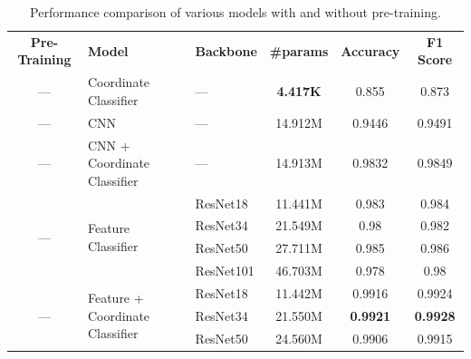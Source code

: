 \documentclass{article}
\begin{document}
\begin{table}[!htp]\centering

  \caption{Performance comparison of various models with and without pre-training.}\label{tab:global_results}
  \scriptsize
  \begin{tabular}{cllccc}\toprule
    \textbf{Pre-Training}             & \textbf{Model}                                   & \textbf{Backbone} & \textbf{\#params} & \textbf{Accuracy} & \textbf{F1 Score} \\ \cmidrule{1-6}
    ---                               & Coordinate Classifier                            & ---               & \textbf{4.417K}   & 0.855             & 0.873             \\ \cmidrule{1-6}
    ---                               & CNN                                              & ---               & 14.912M           & 0.9446            & 0.9491            \\ \cmidrule{1-6}
    ---                               & CNN + Coordinate Classifier                      & ---               & 14.913M           & 0.9832            & 0.9849            \\ \cmidrule{1-6}
    \multirow{4}{*}{---}              & \multirow{4}{*}{Feature Classifier}              & ResNet18          & 11.441M           & 0.983             & 0.984             \\
                                      &                                                  & ResNet34          & 21.549M           & 0.98              & 0.982             \\
                                      &                                                  & ResNet50          & 27.711M           & 0.985             & 0.986             \\
                                      &                                                  & ResNet101         & 46.703M           & 0.978             & 0.98              \\ \cmidrule{1-6}
    \multirow{4}{*}{---}              & \multirow{4}{*}{Feature + Coordinate Classifier} & ResNet18          & 11.442M           & 0.9916            & 0.9924            \\
                                      &                                                  & ResNet34          & 21.550M           & \textbf{0.9921}   & \textbf{0.9928}   \\
                                      &                                                  & ResNet50          & 24.560M           & 0.9906            & 0.9915            \\

\end{tabular}
\end{table}
\end{document}
